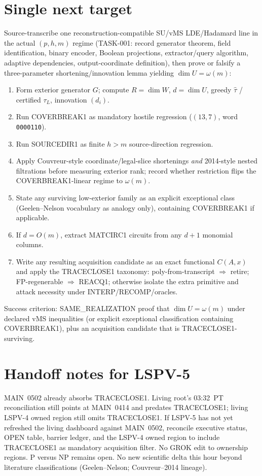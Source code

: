 \documentclass[11pt]{article}
\begin{document}
\section*{Single next target}
Source-transcribe one reconstruction-compatible SU/vMS LDE/Hadamard line in the actual $(p,h,m)$
regime (TASK-001: record generator theorem, field identification, binary encoder, Boolean
projections, extractor/query algorithm, adaptive dependencies, output-coordinate definition),
then prove or falsify a three-parameter shortening/innovation lemma yielding $\dim U=\omega(m)$:
\begin{enumerate}
\item Form exterior generator $G$; compute $R=\dim W$, $d=\dim U$, greedy $\widehat\tau$ /
certified $\tau_L$, innovation $(d_i)$.
\item Run COVERBREAK1 as mandatory hostile regression ($(13,7)$, word \texttt{0000110}).
\item Run SOURCEDIR1 as finite $h>m$ source-direction regression.
\item Apply Couvreur-style coordinate/legal-slice shortenings \emph{and} 2014-style nested
filtrations before measuring exterior rank; record whether restriction flips the
COVERBREAK1-linear regime to $\omega(m)$.
\item State any surviving low-exterior family as an explicit exceptional class (Geelen--Nelson
vocabulary as analogy only), containing COVERBREAK1 if applicable.
\item If $d=O(m)$, extract MATCIRC1 circuits from any $d+1$ monomial columns.
\item Write any resulting acquisition candidate as an exact functional $C(A,x)$ and apply the
TRACECLOSE1 taxonomy: poly-from-transcript $\Rightarrow$ retire; FP-regenerable $\Rightarrow$
REACQ1; otherwise isolate the extra primitive and attack necessity under
INTERP/RECOMP/oracles.
\end{enumerate}
Success criterion: SAME\_REALIZATION proof that $\dim U=\omega(m)$ under declared vMS
inequalities (or explicit exceptional classification containing COVERBREAK1), plus an acquisition
candidate that is TRACECLOSE1-surviving.

\section*{Handoff notes for LSPV-5}
MAIN~0502 already absorbs TRACECLOSE1. Living root's 03:32~PT reconciliation still points at
MAIN~0414 and predates TRACECLOSE1; living LSPV-4 owned region still omits TRACECLOSE1.
If LSPV-5 has not yet refreshed the living dashboard against MAIN~0502, reconcile executive
status, OPEN table, barrier ledger, and the LSPV-4 owned region to include TRACECLOSE1 as
mandatory acquisition filter. No GROK edit to ownership regions. P versus NP remains open.
No new scientific delta this hour beyond literature classifications
(Geelen--Nelson; Couvreur--2014 lineage).
\end{document}

